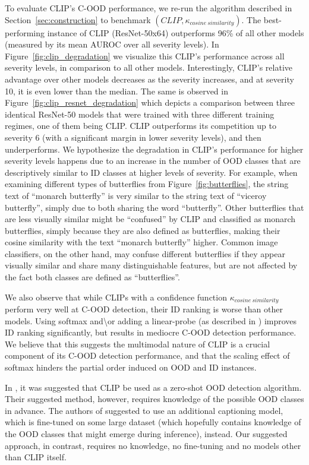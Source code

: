 \documentclass[table]{article} \usepackage{PRIMEarxiv}
\begin{document}
To evaluate CLIP's C-OOD performance, we re-run the algorithm described in Section~\ref{sec:construction} to benchmark $(CLIP, \kappa_{cosine \ similarity})$. The best-performing instance of CLIP (ResNet-50x64) outperforms 96\% of all other models (measured by its mean AUROC over all severity levels). 
In Figure~\ref{fig:clip_degradation} we visualize this CLIP's performance across all severity levels, in comparison to all other models. Interestingly, CLIP's relative advantage over other models decreases as the severity increases, and at severity 10, it is even lower than the median. 
The same is observed in Figure~\ref{fig:clip_resnet_degradation} which depicts a comparison between three identical ResNet-50 models that were trained with three different training regimes, one of them being CLIP. CLIP outperforms its competition up to severity 6 (with a significant margin in lower severity levels), and then underperforms.
We hypothesize the degradation in CLIP's performance for higher severity levels happens due to an increase in the number of OOD classes that are descriptively similar to ID classes at higher levels of severity. 
For example, when examining different types of butterflies from Figure~\ref{fig:butterflies}, the string text of ``monarch butterfly'' is very similar to the string text of ``viceroy butterfly'', simply due to both sharing the word ``butterfly''. Other butterflies that are less visually similar might be ``confused'' by CLIP and classified as monarch butterflies, simply because they are also defined as butterflies, making their cosine similarity with the text ``monarch butterfly'' higher. Common image classifiers, on the other hand, may confuse different butterflies if they appear visually similar and share many distinguishable features, but are not affected by the fact both classes are defined as ``butterflies''.


We also observe that while CLIPs with a confidence function $\kappa_{cosine \ similarity}$ perform very well at C-OOD detection, their ID ranking is worse than other models. Using softmax and\textbackslash or adding a linear-probe (as described in \citet{DBLP:conf/icml/RadfordKHRGASAM21}) improves ID ranking significantly, but results in mediocre C-OOD detection performance.
We believe that this suggests the multimodal nature of CLIP is a crucial component of its C-OOD detection performance, and that the scaling effect of softmax hinders the partial order induced on OOD and ID instances.

In \citet{DBLP:conf/nips/FortRL21}, it was suggested that CLIP be used as a zero-shot OOD detection algorithm. Their suggested method, however, requires knowledge of the possible OOD classes in advance. The authors of \citet{DBLP:conf/aaai/Esmaeilpour00022} suggested to use an additional captioning model, which is fine-tuned on some large dataset (which hopefully contains knowledge of the OOD classes that might emerge during inference), instead. Our suggested approach, in contrast, requires no knowledge, no fine-tuning and no models other than CLIP itself.
\end{document}
